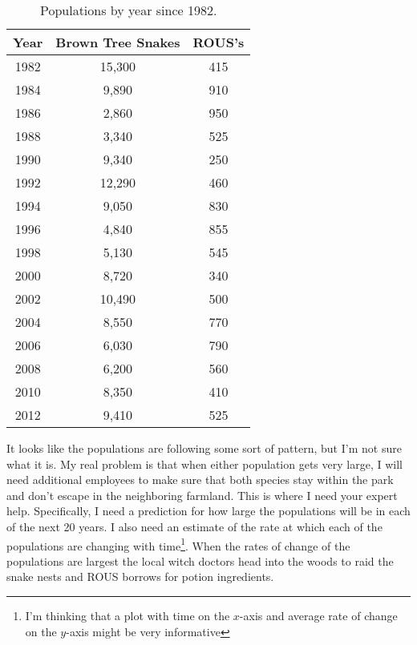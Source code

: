\begin{lab}
\begin{table}[h!]
    \begin{center}
        \begin{tabular}{|c|c|c|}
            \hline
            Year & Brown Tree Snakes & ROUS's \\ \hline \hline
            1982 & 15,300   & 415       \\
            1984 & 9,890    & 910       \\
            1986 & 2,860    & 950       \\
            1988 & 3,340    & 525       \\
            1990 & 9,340    & 250       \\
            1992 & 12,290   & 460       \\
            1994 & 9,050    & 830       \\
            1996 & 4,840    & 855       \\
            1998 & 5,130    & 545       \\
            2000 & 8,720    & 340       \\
            2002 & 10,490   & 500       \\
            2004 & 8,550    & 770       \\
            2006 & 6,030    & 790       \\
            2008 & 6,200    & 560       \\
            2010 & 8,350    & 410       \\
            2012 & 9,410    & 525       \\
            \hline
        \end{tabular}
        \caption{Populations by year since 1982.}
        \label{tab:pop_table}
    \end{center}
\end{table}

It looks like the populations are following some sort of pattern, but I'm not sure what it
is.  My real problem is that when either population gets very large, I will need
additional employees to make sure that both species stay within the park and don't escape
in the neighboring farmland.  This is where I need your expert help. Specifically, I need
a prediction for how large the populations will be in each of the next 20 years.  I also
need an estimate of the rate at which each of the populations are changing with
time\footnote{I'm thinking that a plot with time on the $x$-axis and average rate of
change on the $y$-axis might be very informative}. When the rates of change of the
populations are largest the local witch doctors head into the woods to raid the snake
nests and ROUS borrows for potion ingredients. 


\end{lab}
